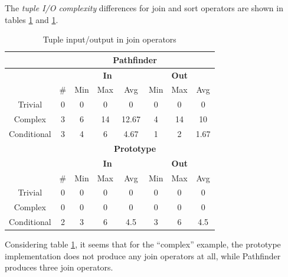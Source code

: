 \newpage
The \textit{tuple I/O complexity} differences for \textsf{join}
and \textsf{sort} operators are shown in tables
\ref{table:result:complexity_matrix_tio_1} and
\ref{table:result:complexity_matrix_tio_1}.

\begin{table}[!htp]
 \begin{center}
 \begin{tabular}{| c | c | c | c | c | c | c | c |}
  \hline
   & \multicolumn{7}{|c|}{\textbf{Pathfinder}} \\
   \hline
   &  & \multicolumn{3}{|c|}{\textbf{In}} &
   \multicolumn{3}{|c|}{\textbf{Out}}  \\
   \hline
   &  \# & Min & Max & Avg & Min & Max & Avg\\
   \hline
   Trivial & 0 & 0 & 0 & 0 & 0 & 0 & 0  \\
   \hline
   Complex & 3 & 6 & 14 & 12.67 & 4 & 14 & 10  \\
   \hline
   Conditional & 3 & 4 & 6 & 4.67 & 1 & 2 & 1.67  \\
   \hline
   & \multicolumn{7}{|c|}{\textbf{Prototype}} \\
   \hline
   &  & \multicolumn{3}{|c|}{\textbf{In}} & 
   \multicolumn{3}{|c|}{\textbf{Out}} \\
   \hline
   & \# & Min & Max & Avg & Min & Max & Avg \\ 
   \hline 
   Trivial & 0 & 0 & 0 & 0 & 0 & 0 & 0 \\
   \hline
   Complex & 0 & 0 & 0 & 0 & 0 & 0 & 0 \\
   \hline
   Conditional & 2 & 3 & 6 & 4.5 & 3 & 6 & 4.5 \\
   \hline
 \end{tabular}
\caption{Tuple input/output in join operators}
\label{table:result:complexity_matrix_tio_1}
 \end{center}
\end{table}

Considering table \ref{table:result:complexity_matrix_tio_1}, it seems that for
the ``complex'' example, the prototype implementation does not produce any
join operators at all, while Pathfinder produces three join operators.

